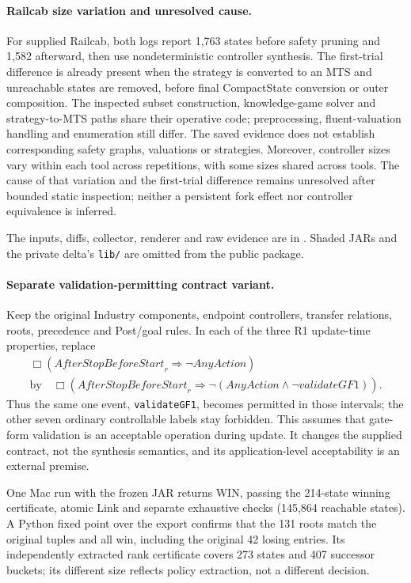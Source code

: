 \documentclass[11pt]{article}
\begin{document}
\paragraph{Railcab size variation and unresolved cause.}
For supplied Railcab, both logs report 1,763 states before safety pruning and 1,582 afterward, then use nondeterministic controller synthesis. The first-trial difference is already present when the strategy is converted to an MTS and unreachable states are removed, before final CompactState conversion or outer composition. The inspected subset construction, knowledge-game solver and strategy-to-MTS paths share their operative code; preprocessing, fluent-valuation handling and enumeration still differ. The saved evidence does not establish corresponding safety graphs, valuations or strategies. Moreover, controller sizes vary within each tool across repetitions, with some sizes shared across tools. The cause of that variation and the first-trial difference remains unresolved after bounded static inspection; neither a persistent fork effect nor controller equivalence is inferred.


The inputs, diffs, collector, renderer and raw evidence are in . Shaded JARs and the private delta's \texttt{lib/} are omitted from the public package.

\paragraph{Separate validation-permitting contract variant.}
Keep the original Industry components, endpoint controllers, transfer relations, roots, precedence and Post/goal rules. In each of the three R1 update-time properties, replace
\[
\begin{gathered}
\Box(\mathit{AfterStopBeforeStart}_r\Rightarrow\neg\mathit{AnyAction})\\
\text{by}\quad
\Box(\mathit{AfterStopBeforeStart}_r\Rightarrow
\neg(\mathit{AnyAction}\land\neg\mathit{validateGF1})).
\end{gathered}
\]
Thus the same one event, \texttt{validateGF1}, becomes permitted in those intervals; the other seven ordinary controllable labels stay forbidden. This assumes that gate-form validation is an acceptable operation during update. It changes the supplied contract, not the synthesis semantics, and its application-level acceptability is an external premise.

One Mac run with the frozen JAR returns WIN, passing the 214-state winning certificate, atomic Link and separate exhaustive checks (145,864 reachable states). A Python fixed point over the export confirms that the 131 roots match the original tuples and all win, including the original 42 losing entries. Its independently extracted rank certificate covers 273 states and 407 successor buckets; its different size reflects policy extraction, not a different decision.
\end{document}
